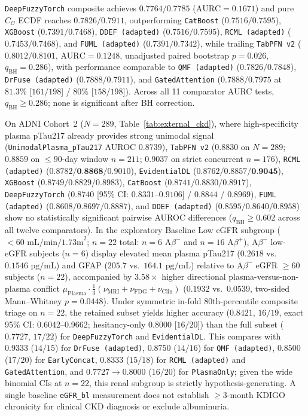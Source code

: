 \documentclass[10pt,twocolumn]{article}
\begin{document}
\texttt{DeepFuzzyTorch} composite achieves $0.7764 / 0.7785$ ($\text{AURC}=0.1671$) and pure
$C_{\mathcal{O}}$ ECDF reaches $0.7826 / 0.7911$, outperforming \texttt{CatBoost} ($0.7516 /
0.7595$), \texttt{XGBoost} ($0.7391 / 0.7468$), \texttt{DDEF (adapted)} ($0.7516 / 0.7595$),
\texttt{RCML (adapted)} ($0.7453 / 0.7468$), and \texttt{FUML (adapted)} ($0.7391 / 0.7342$),
while trailing
\texttt{TabPFN~v2} ($0.8012 / 0.8101$, $\text{AURC}=0.1248$, unadjusted paired bootstrap
$p=0.026$,
$q_{\text{BH}}=0.286$), with performance comparable to \texttt{QMF (adapted)}
($0.7826 / 0.7848$), \texttt{DrFuse (adapted)} ($0.7888 / 0.7911$), and
\texttt{GatedAttention} ($0.7888 / 0.7975$ at $81.3\%$ [$161/198$] / $80\%$ [$158/198$]).
Across all 11
comparator AURC tests, $q_{\text{BH}}\ge0.286$; none is significant after BH correction.

On ADNI Cohort~2 ($N=289$, Table~\ref{tab:external_ckd}), where high-specificity plasma pTau217
already provides strong unimodal signal (\texttt{UnimodalPlasma\_pTau217} AUROC $0.8739$),
\texttt{TabPFN~v2} ($0.8830$ on $N=289$; $0.8859$ on $\le 90$-day window $n=211$; $0.9037$ on
strict concurrent $n=176$), \texttt{RCML (adapted)} ($0.8782 / \textbf{0.8868} / 0.9010$),
\texttt{EvidentialDL} ($0.8762 / 0.8857 / \textbf{0.9045}$), \texttt{XGBoost} ($0.8749 / 0.8829
/
0.8983$), \texttt{CatBoost} ($0.8741 / 0.8830 / 0.8917$), \texttt{DeepFuzzyTorch} ($0.8740$
[95\% CI: $0.8331\text{--}0.9106$] / $0.8844$ / $0.8969$), \texttt{FUML (adapted)} ($0.8608 /
0.8697 / 0.8887$), and \texttt{DDEF (adapted)} ($0.8595 / 0.8640 / 0.8958$) show no
statistically
significant pairwise AUROC differences ($q_{\text{BH}} \ge 0.602$ across all twelve
comparators).
In the exploratory Baseline Low eGFR subgroup ($<60\text{ mL/min/1.73m}^2$; $n=22$ total:
$n=6$ A$\beta^-$ and $n=16$ A$\beta^+$), A$\beta^-$ low-eGFR subjects ($n=6$) display
elevated mean plasma pTau217 ($0.2618$ vs.\
$0.1546\text{ pg/mL}$) and GFAP ($205.7$ vs.\ $164.1\text{ pg/mL}$) relative to A$\beta^-$
eGFR $\ge 60$ subjects ($n=22$), accompanied by $3.58\times$ higher directional
plasma-versus-non-plasma conflict $\mu_{\text{Plasma}}\cdot
\frac{1}{3}(\nu_{\text{MRI}}+\nu_{\text{FDG}}+\nu_{\text{Clin}})$ ($0.1932$ vs.\ $0.0539$,
two-sided Mann--Whitney $p = 0.0448$). Under symmetric in-fold 80th-percentile composite triage
on $n=22$, the retained subset yields higher accuracy ($0.8421$, $16/19$, exact 95\%
CI: 0.6042--0.9662; hesitancy-only $0.8000$ [$16/20$]) than the full subset ($0.7727$,
$17/22$) for \texttt{DeepFuzzyTorch} and
\texttt{EvidentialDL}. This compares with $0.9333$ ($14/15$) for \texttt{DrFuse (adapted)},
$0.8750$ ($14/16$) for \texttt{QMF (adapted)}, $0.8500$ ($17/20$) for \texttt{EarlyConcat},
$0.8333$
($15/18$) for \texttt{RCML (adapted)} and \texttt{GatedAttention}, and $0.7727 \to 0.8000$
($16/20$) for \texttt{PlasmaOnly}; given the wide binomial CIs at $n=22$, this renal subgroup
is strictly hypothesis-generating. A single baseline \texttt{eGFR\_bl} measurement does not
establish $\ge 3$-month KDIGO chronicity for clinical CKD diagnosis or exclude albuminuria.
\end{document}
